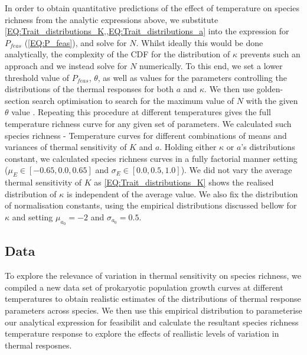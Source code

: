 \documentclass{article}
\begin{document}
In order to obtain quantitative predictions of the effect of temperature on species richness from the analytic expressions above, we substitute \cref{EQ:Trait_distributions_K,,EQ:Trait_distributions_a} into the expression for $P_{feas}$ (\cref{EQ:P_feas}), and solve for $N$. Whilst ideally this would be done analytically, the complexity of the CDF for the distribution of $\kappa$ prevents such an approach and we instead solve for $N$ numerically. To this end, we set a lower threshold value of $P_{feas}$, $\theta$, as well as values for the parameters controlling the distributions of the thermal responses for both $a$ and $\kappa$. We then use golden-section search optimisation to search for the maximum value of $N$ with the given $\theta$ value \citep{Mogensen2018}. Repeating this procedure at different temperatures gives the full temperature richness curve for any given set of parameters. We calculated such species richness - Temperature curves for different combinations of means and variances of thermal sensitivity of $K$ and $a$. Holding either $\kappa$ or $a$'s distributions constant, we calculated species richness curves in a fully factorial manner setting ($\mu_{E} \in [-0.65, 0.0, 0.65]$ and $\sigma_{E} \in [0.0, 0.5, 1.0]$). We did not vary the average thermal sensitivity of $K$ as \cref{EQ:Trait_distributions_K} shows the realised distribution of $\kappa$ is independent of the average value. We also fix the distribution of normalisation constants, using the empirical distributions discussed bellow for $\kappa$ and setting $\mu_{a_0} = -2$ and $\sigma_{a_0} = 0.5$.

\subsection*{Data}

To explore the relevance of variation in thermal sensitivity on species richness, we compiled a new data set of prokaryotic population growth curves at different temperatures to obtain realistic estimates of the distributions of thermal response parameters across species. We then use this empirical distribution to parameterise our analytical expression for feasibilit and calculate the resultant species richness temperature response to explore the effects of reallistic levels of variation in thermal resposnes. 
\end{document}
